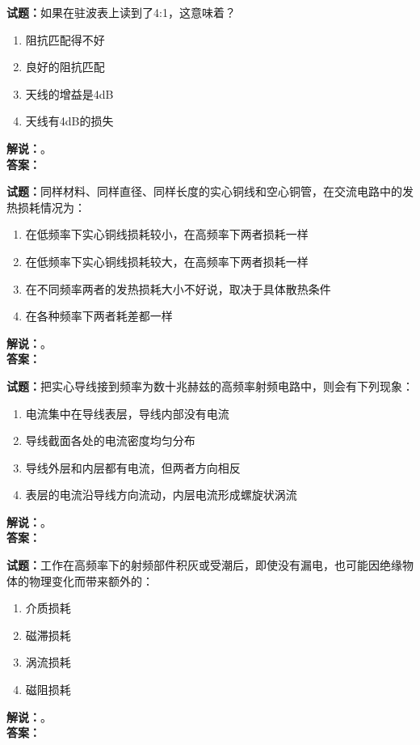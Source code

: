 \documentclass{ctexbook}
\begin{document}
\bigskip




\noindent\textbf{试题：}如果在驻波表上读到了4:1，这意味着？
\begin{enumerate}[leftmargin=3em]
\item 阻抗匹配得不好
\item 良好的阻抗匹配
\item 天线的增益是4dB
\item 天线有4dB的损失
\end{enumerate}
\noindent\textbf{解说：}\textbf{}。\\\noindent\textbf{答案：}

\bigskip




\noindent\textbf{试题：}同样材料、同样直径、同样长度的实心铜线和空心铜管，在交流电路中的发热损耗情况为：
\begin{enumerate}[leftmargin=3em]
\item 在低频率下实心铜线损耗较小，在高频率下两者损耗一样
\item 在低频率下实心铜线损耗较大，在高频率下两者损耗一样
\item 在不同频率两者的发热损耗大小不好说，取决于具体散热条件
\item 在各种频率下两者耗差都一样
\end{enumerate}
\noindent\textbf{解说：}\textbf{}。\\\noindent\textbf{答案：}

\bigskip




\noindent\textbf{试题：}把实心导线接到频率为数十兆赫兹的高频率射频电路中，则会有下列现象：
\begin{enumerate}[leftmargin=3em]
\item 电流集中在导线表层，导线内部没有电流
\item 导线截面各处的电流密度均匀分布
\item 导线外层和内层都有电流，但两者方向相反
\item 表层的电流沿导线方向流动，内层电流形成螺旋状涡流
\end{enumerate}
\noindent\textbf{解说：}\textbf{}。\\\noindent\textbf{答案：}

\bigskip




\noindent\textbf{试题：}工作在高频率下的射频部件积灰或受潮后，即使没有漏电，也可能因绝缘物体的物理变化而带来额外的：
\begin{enumerate}[leftmargin=3em]
\item 介质损耗
\item 磁滞损耗
\item 涡流损耗
\item 磁阻损耗
\end{enumerate}
\noindent\textbf{解说：}\textbf{}。\\\noindent\textbf{答案：}
\end{document}
